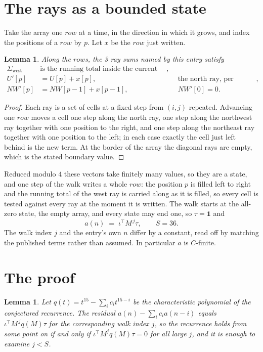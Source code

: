 \documentclass[11pt,a4paper]{article}
\theoremstyle{plain}
\newtheorem{lemma}[theorem]{Lemma}
\theoremstyle{definition}
\begin{document}
\section{The rays as a bounded state}

Take the array one $row$ at a time, in the direction in which it grows, and index the
positions of a $row $ by $p$. Let $x$ be the $row$ just written.

\begin{lemma}\label{lem:rays}
Along the $row$s, the 3 ray sums named by this entry satisfy
\[
\begin{aligned}
\Sigma_{\mathrm{west}}\ &\text{is the running total inside the current row},\\
U'[p]&=U[p]+x[p], &&\text{the north ray, per position},\\
NW'[p]&=NW[p-1]+x[p-1], && NW'[0]=0 .
\end{aligned}
\]
\end{lemma}

\begin{proof}
Each ray is a set of cells at a fixed step from $(i,j)$ repeated. Advancing one $row$
moves a cell one step along the north ray, one step along the northwest ray together with one
position to the right, and one step along the northeast ray together with one position to the
left; in each case exactly the cell just left behind is the new term. At the border of the
array the diagonal rays are empty, which is the stated boundary value.
\end{proof}

Reduced modulo $4$ these vectors take finitely many values, so they are a state, and one step
of the walk writes a whole $row$: the position $p$ is filled left to right and the
running total of the west ray is carried along as it is filled, so every cell is tested
against every ray at the moment it is written. The walk starts at the all-zero state, the empty
array, and every state may end one, so $\tau=\mathbf{1}$ and
\[
a(n)\;=\;\iota^{\!\top}M^{\,j}\tau ,\qquad S=36.
\]
The walk index $j$ and the entry's own $n$ differ by a constant, read off by matching the
published terms rather than assumed. In particular $a$ is $C$-finite.

\section{The proof}

\begin{lemma}\label{lem:crit}
Let $q(t)=t^{15}-\sum_i c_it^{15-i}$ be the characteristic polynomial of the
conjectured recurrence. The residual $a(n)-\sum_ic_ia(n-i)$ equals
$\iota^{\!\top}M^{\,j}q(M)\tau$ for the corresponding walk index $j$, so the recurrence
holds from some point on if and only if $\iota^{\!\top}M^{j}q(M)\tau=0$ for all large $j$,
and it is enough to examine $j<S$.
\end{lemma}
\end{document}
